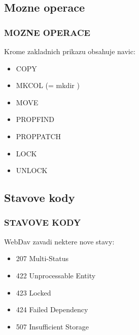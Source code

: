\documentclass{beamer}
\begin{document}
\subsection{Mozne operace}
\begin{frame}
    \frametitle{MOZNE OPERACE}
Krome zakladnich prikazu obsahuje navic:
    \begin{itemize}
        \item COPY
        \item MKCOL (= mkdir )
        \item MOVE
        \item PROPFIND
        \item PROPPATCH
        \item LOCK
        \item UNLOCK
    \end{itemize}
\end{frame}

\subsection{Stavove kody}
\begin{frame}
    \frametitle{STAVOVE KODY}
WebDav zavadi nektere nove stavy:
    \begin{itemize}
        \item 207 Multi-Status
        \item 422 Unprocessable Entity
        \item 423 Locked
        \item 424 Failed Dependency
        \item 507 Insufficient Storage
    \end{itemize}
\end{frame}
\end{document}
